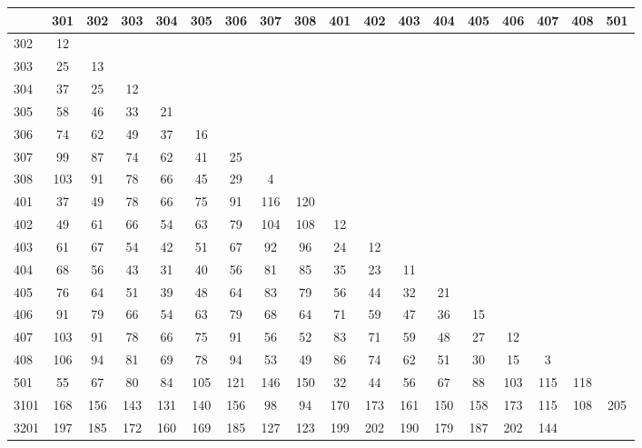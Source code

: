 \begin{table}[htbp]
 \begin{center}
  {\tiny
  \begin{tabular}{lccccccccccccccccc}
%
\hline
 & 301 & 302 & 303 & 304 & 305 & 306 & 307 & 308 & 401 & 402 & 403 & 404
   & 405 & 406 & 407 & 408 & 501 \\
\hline
302 & 12 &  &  &  &  &  &  &  &  &  &  &  &  &  &  &  &  \\
303 & 25 & 13 &  &  &  &  &  &  &  &  &  &  &  &  &  &  &  \\
304 & 37 & 25 & 12 &  &  &  &  &  &  &  &  &  &  &  &  &  &  \\
305 & 58 & 46 & 33 & 21 &  &  &  &  &  &  &  &  &  &  &  &  &  \\
306 & 74 & 62 & 49 & 37 & 16 &  &  &  &  &  &  &  &  &  &  &  &  \\
307 & 99 & 87 & 74 & 62 & 41 & 25 &  &  &  &  &  &  &  &  &  &  &  \\
308 & 103 & 91 & 78 & 66 & 45 & 29 & 4 &  &  &  &  &  &  &  &  &  &  \\
401 & 37 & 49 & 78 & 66 & 75 & 91 & 116 & 120 &  &  &  &  &  &  &  &  &  \\
402 & 49 & 61 & 66 & 54 & 63 & 79 & 104 & 108 & 12 &  &  &  &  &  &  &
								   &  \\
403 & 61 & 67 & 54 & 42 & 51 & 67 & 92 & 96 & 24 & 12 &  &  &  &  &  &
								   &  \\
404 & 68 & 56 & 43 & 31 & 40 & 56 & 81 & 85 & 35 & 23 & 11 &  &  &  &  &
								   &  \\
405 & 76 & 64 & 51 & 39 & 48 & 64 & 83 & 79 & 56 & 44 & 32 & 21 &  &  &
							       &  &  \\
406 & 91 & 79 & 66 & 54 & 63 & 79 & 68 & 64 & 71 & 59 & 47 & 36 & 15 &
							   &  &  &  \\
407 & 103 & 91 & 78 & 66 & 75 & 91 & 56 & 52 & 83 & 71 & 59 & 48 & 27 &
							   12 &  &  &  \\
408 & 106 & 94 & 81 & 69 & 78 & 94 & 53 & 49 & 86 & 74 & 62 & 51 & 30 &
							   15 & 3 &  &  \\
501 & 55 & 67 & 80 & 84 & 105 & 121 & 146 & 150 & 32 & 44 & 56 & 67 & 88
						       & 103 & 115 & 118
								   &  \\
3101 & 168 & 156 & 143 & 131 & 140 & 156 & 98 & 94 & 170 & 173 & 161 &
						   150 & 158 & 173 & 115
							       & 108 &
								       205 \\
3201 & 197 & 185 & 172 & 160 & 169 & 185 & 127 & 123 & 199 & 202 & 190 &
						   179 & 187 & 202 & 144

\end{tabular}}
\end{center}
\end{table}
